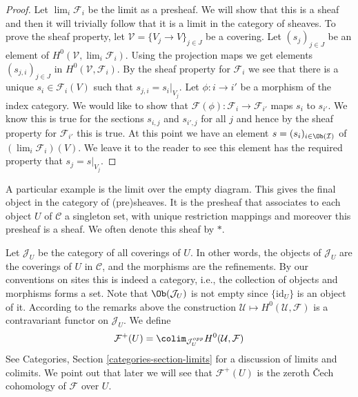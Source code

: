 \begin{proof}
Let $\lim_i \mathcal{F}_i$ be the limit as a presheaf.
We will show that this is a sheaf and then it will trivially follow
that it is a limit in the category of sheaves. To prove the sheaf
property, let $\mathcal{V} = \{V_j \to V\}_{j\in J}$ be a covering.
Let $(s_j)_{j\in J}$ be an element of $H^0(\mathcal{V}, \lim_i \mathcal{F}_i)$.
Using the projection maps we get elements $(s_{j, i})_{j\in J}$
in $H^0(\mathcal{V}, \mathcal{F}_i)$. By the sheaf property for
$\mathcal{F}_i$ we see that there is a unique $s_i \in \mathcal{F}_i(V)$
such that $s_{j, i} = s_i|_{V_j}$. Let $\phi : i \to i'$ be a morphism
of the index category. We would like to show that
$\mathcal{F}(\phi) : \mathcal{F}_i \to \mathcal{F}_{i'}$
maps $s_i$ to $s_{i'}$. We know this is true for the sections
$s_{i, j}$ and $s_{i', j}$ for all $j$ and hence by the sheaf property
for $\mathcal{F}_{i'}$ this is true. At this point we have an
element $s = (s_i)_{i \in \Ob(\mathcal{I})}$ of
$(\lim_i \mathcal{F}_i)(V)$. We leave it to the reader to see
this element has the required property that $s_j = s|_{V_j}$.
\end{proof}

\begin{example}
\label{example-singleton-sheaf}
A particular example is the limit over the empty diagram.
This gives the final object in the category of (pre)sheaves.
It is the presheaf that associates
to each object $U$ of $\mathcal{C}$ a singleton set, with unique
restriction mappings and moreover this presheaf is a sheaf.
We often denote this sheaf by $*$.
\end{example}

\noindent
Let $\mathcal{J}_U$ be the category of all coverings of $U$.
In other words, the objects of $\mathcal{J}_U$ are the coverings
of $U$ in $\mathcal{C}$, and the morphisms are the refinements.
By our conventions on sites this is indeed a category, i.e.,
the collection of objects and morphisms forms a set.
Note that $\Ob(\mathcal{J}_U)$ is not empty since
$\{\text{id}_U\}$ is an object of it. According to the remarks
above the construction $\mathcal{U} \mapsto H^0(\mathcal{U}, \mathcal{F})$
is a contravariant functor on $\mathcal{J}_U$.
We define
$$
\mathcal{F}^{+}(U)
=
\colim_{\mathcal{J}_U^{opp}}
H^0(\mathcal{U}, \mathcal{F})
$$
See Categories, Section \ref{categories-section-limits} for
a discussion of limits and colimits. We point out that later
we will see that $\mathcal{F}^{+}(U)$ is the zeroth {\v C}ech
cohomology of $\mathcal{F}$ over $U$.


